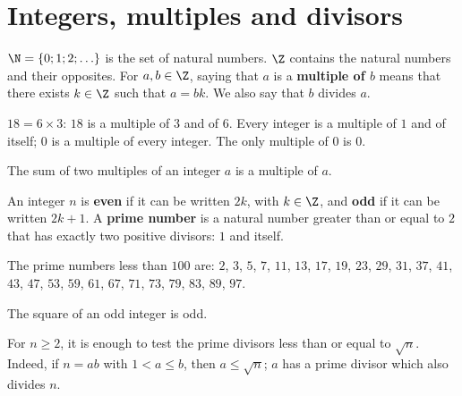 \section{Integers, multiples and divisors}
\begin{cours}[Definitions]
$\N=\{0;1;2;\ldots\}$ is the set of natural numbers. $\Z$ contains the natural numbers and their opposites.
For $a,b\in\Z$, saying that $a$ is a \textbf{multiple of $b$} means that there exists $k\in\Z$ such that $a=bk$. We also say that $b$ divides $a$.
\end{cours}
$18=6\times3$: $18$ is a multiple of $3$ and of $6$. Every integer is a multiple of $1$ and of itself; $0$ is a multiple of every integer. The only multiple of $0$ is $0$.
\begin{cours}
The sum of two multiples of an integer $a$ is a multiple of $a$.
\end{cours}

\begin{cours}[Definitions]
An integer $n$ is \textbf{even} if it can be written $2k$, with $k\in\Z$, and \textbf{odd} if it can be written $2k+1$.
A \textbf{prime number} is a natural number greater than or equal to $2$ that has exactly two positive divisors: $1$ and itself.
\end{cours}
The prime numbers less than $100$ are: $2$, $3$, $5$, $7$, $11$, $13$, $17$, $19$, $23$, $29$, $31$, $37$, $41$, $43$, $47$, $53$, $59$, $61$, $67$, $71$, $73$, $79$, $83$, $89$, $97$.
\begin{cours}
The square of an odd integer is odd.
\end{cours}
\begin{methode}
For $n\geq2$, it is enough to test the prime divisors less than or equal to $\sqrt n$. Indeed, if $n=ab$ with $1<a\leq b$, then $a\leq\sqrt n$; $a$ has a prime divisor which also divides $n$.
\end{methode}

